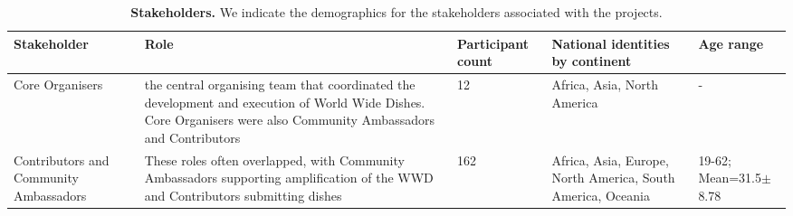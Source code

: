 \begin{table}[h]
\centering
\renewcommand{\arraystretch}{1.5}

\caption{\small \textbf{Stakeholders.} We indicate the demographics for the stakeholders associated with the projects.}
\label{tab:stakeholder_tally}
\small
\begin{tabular}{p{2cm}>{\footnotesize}p{3.5cm}p{2cm}p{3.5cm}p{1.5cm}}
\toprule
\textbf{Stakeholder} & \textbf{Role} & \textbf{Participant count} & \textbf{National identities by continent} & \textbf{Age range}\\ 
\midrule
Core Organisers & the central organising team that coordinated the development and execution of World Wide Dishes. Core Organisers were also Community Ambassadors and Contributors & 12 & Africa, Asia, North America & - \\
Contributors and Community Ambassadors & These roles often overlapped, with Community Ambassadors supporting amplification of the WWD and Contributors submitting dishes & 162 & Africa, Asia, Europe, North America, South America, Oceania & 19-62; Mean=31.5$\pm$8.78 \\
\bottomrule
\end{tabular}
\end{table}